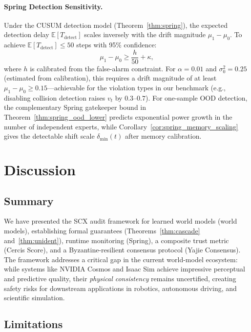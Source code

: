 \documentclass[11pt,twocolumn]{article}
\theoremstyle{definition}
\newcommand{\E}{\mathbb{E}}
\begin{document}
\paragraph{Spring Detection Sensitivity.}
Under the CUSUM detection model (Theorem~\ref{thm:spring}), the expected
detection delay $\E[T_{\text{detect}}]$ scales inversely with the drift
magnitude $\mu_1 - \mu_0$.  To achieve $\E[T_{\text{detect}}] \le 50$ steps
with 95\% confidence:
\begin{equation}
  \mu_1 - \mu_0 \ge \frac{h}{50} + \kappa,
\end{equation}
where $h$ is calibrated from the false-alarm constraint.  For $\alpha = 0.01$
and $\sigma_0^2 = 0.25$ (estimated from calibration), this requires a drift
magnitude of at least $\mu_1 - \mu_0 \ge 0.15$---achievable for the
violation types in our benchmark (e.g., disabling collision detection raises
$v_t$ by $0.3$--$0.7$).  For one-sample OOD detection, the complementary
Spring gatekeeper bound in Theorem~\ref{thm:spring_ood_lower} predicts
exponential power growth in the number of independent experts, while
Corollary~\ref{cor:spring_memory_scaling} gives the detectable shift scale
$\delta_{\min}(t)$ after memory calibration.

\section{Discussion}
\label{sec:discussion}

\subsection{Summary}

We have presented the SCX audit framework for learned world models
(world models), establishing formal guarantees (Theorems~\ref{thm:cascade}
and~\ref{thm:unident}), runtime monitoring (Spring), a composite trust metric
(Cercis Score), and a Byzantine-resilient consensus protocol (Yajie Consensus).  The framework addresses a critical gap in the current
world-model ecosystem: while systems like NVIDIA Cosmos and Isaac Sim achieve
impressive perceptual and predictive quality, their \emph{physical
consistency} remains uncertified, creating safety risks for downstream
applications in robotics, autonomous driving, and scientific simulation.

\subsection{Limitations}
\end{document}
